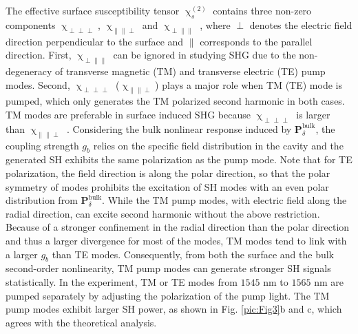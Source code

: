 \documentclass[a4paper,8pt,hyperref, twocolumn, aps, prl]{article}
\begin{document}
The effective surface susceptibility tensor $\upchi^{(2)}_s$ contains three non-zero components $\upchi_{\perp \perp \perp}$, $\upchi_{\parallel \parallel \perp}$ and $\upchi_{\perp \parallel \parallel}$ \cite{heinz1991second}, where $\perp$ denotes the electric field direction perpendicular to the surface and $\parallel$ corresponds to the parallel direction. 
First, $\upchi_{\perp \parallel \parallel}$ can be ignored in studying SHG due to the non-degeneracy of transverse magnetic (TM) and  transverse electric (TE) pump modes.  
Second, $\upchi_{\perp \perp \perp}$ ($\upchi_{\parallel \parallel \perp}$) plays a major role when TM (TE) mode is pumped, which only generates the TM polarized second harmonic in both cases. 
TM modes are preferable in surface induced SHG because $\upchi_{\perp \perp \perp}$ is larger than $\upchi_{\parallel \parallel \perp}$ \cite{rodriguez2008calibration}. 
Considering the bulk nonlinear response induced by $\mathbf{P}^{\mathrm{bulk}}_\delta$, the coupling strength $g_b$ relies on the specific field distribution in the cavity and the generated SH exhibits the same polarization as the pump mode. 
Note that for TE polarization, the field direction is along the polar direction, so that the polar symmetry of modes prohibits the excitation of SH modes with an even polar distribution from $\mathbf{P}^{\mathrm{bulk}}_\delta$. 
While the TM pump modes, with electric field along the radial direction, can excite second harmonic without the above restriction.
Because of a stronger confinement in the radial direction than the polar direction and thus a larger divergence for most of the modes, TM modes tend to link with a larger $g_b$ than TE modes. 
Consequently, from both the surface and the bulk second-order nonlinearity, TM pump modes can generate stronger SH signals statistically. 
In the experiment, TM or TE modes from $1545$ nm to $1565$ nm are pumped separately by adjusting the polarization of the pump light.
The TM pump modes exhibit larger SH power, as shown in Fig. \ref{pic:Fig3}b and c, which agrees with the theoretical analysis.
\end{document}
